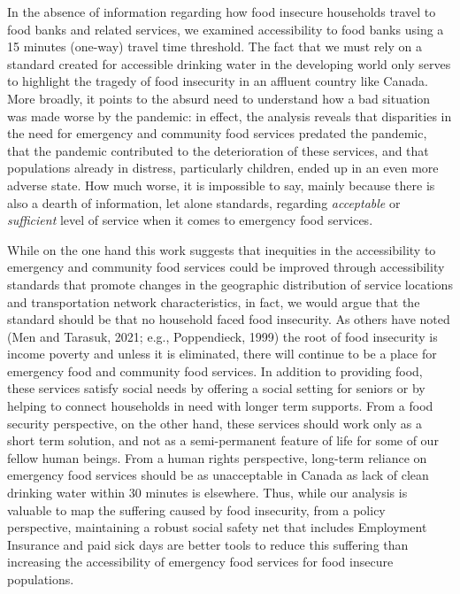 \documentclass[]{elsarticle} %
\begin{document}
In the absence of information regarding how food insecure households
travel to food banks and related services, we examined accessibility to
food banks using a 15 minutes (one-way) travel time threshold. The fact
that we must rely on a standard created for accessible drinking water in
the developing world only serves to highlight the tragedy of food
insecurity in an affluent country like Canada. More broadly, it points
to the absurd need to understand how a bad situation was made worse by
the pandemic: in effect, the analysis reveals that disparities in the
need for emergency and community food services predated the pandemic,
that the pandemic contributed to the deterioration of these services,
and that populations already in distress, particularly children, ended
up in an even more adverse state. How much worse, it is impossible to
say, mainly because there is also a dearth of information, let alone
standards, regarding \emph{acceptable} or \emph{sufficient} level of
service when it comes to emergency food services.

While on the one hand this work suggests that inequities in the
accessibility to emergency and community food services could be improved
through accessibility standards that promote changes in the geographic
distribution of service locations and transportation network
characteristics, in fact, we would argue that the standard should be
that no household faced food insecurity. As others have noted (Men and
Tarasuk, 2021; e.g., Poppendieck, 1999) the root of food insecurity is
income poverty and unless it is eliminated, there will continue to be a
place for emergency food and community food services. In addition to
providing food, these services satisfy social needs by offering a social
setting for seniors or by helping to connect households in need with
longer term supports. From a food security perspective, on the other
hand, these services should work only as a short term solution, and not
as a semi-permanent feature of life for some of our fellow human beings.
From a human rights perspective, long-term reliance on emergency food
services should be as unacceptable in Canada as lack of clean drinking
water within 30 minutes is elsewhere. Thus, while our analysis is
valuable to map the suffering caused by food insecurity, from a policy
perspective, maintaining a robust social safety net that includes
Employment Insurance and paid sick days are better tools to reduce this
suffering than increasing the accessibility of emergency food services
for food insecure populations.
\end{document}
